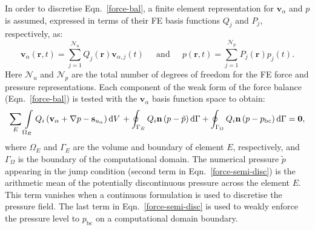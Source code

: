 In order to discretise Eqn.~\ref{force-bal}, a finite element representation for $\mathbf{v}_\alpha$ and $p$ is assumed, expressed in terms of their FE basis functions $Q_{j}$ and $P_{j}$, respectively, as:
\begin{equation}
  \mathbf{v}_\alpha(\bm{r},t) = \sum\limits_{j=1}^{\mathcal{N}_u} Q_{j}(\bm{r})\mathbf{v}_{\alpha,j}(t) \;\;\;\;\text{ and } \;\;\;\; p(\bm{r},t) = \sum\limits_{j=1}^{\mathcal{N}_p} P_{j}(\bm{r})p_{j}(t).
\end{equation} 
Here $\mathcal{N}_{u}$ and $\mathcal{N}_{p}$ are the total number of degrees of freedom for the FE force and pressure representations. Each component of the weak form of the force balance (Eqn.~\ref{force-bal}) is tested with the $\mathbf{v}_\alpha$ basis function space to obtain:
\begin{displaymath}
  \sum\limits_{E} \left. \int\limits_{\Omega_E} { {Q}}_i \left({\mathbf v}_\alpha + \nabla p  -{\mathbf s}_{u_\alpha}\right) \mathrm{d} V \right. + \displaystyle \oint_{\Gamma_{E}} {Q}_i {\mathbf n} \left(p - \tilde{p}\right) \mathrm{d}\Gamma + \oint_{\Gamma_{\Omega}} {Q}_i {\mathbf n} \left(p - p_\text{bc}\right) \mathrm{d}\Gamma = \bm{0},\nonumber \label{force-semi-disc} 
\end{displaymath} 
where $\Omega_E$ and $\Gamma_{E}$ are the volume and boundary of element $E$, respectively, and $\Gamma_{\Omega}$ is the boundary of the computational domain. The numerical pressure $\tilde{p}$ appearing in the jump condition (second term in Eqn.~\ref{force-semi-disc}) is the arithmetic mean of the potentially discontinuous pressure across the element $E$. This term vanishes when a continuous formulation is used to discretise the pressure field. The last term in Eqn.~\ref{force-semi-disc} is used to weakly enforce the pressure level to $p_\text{bc}$ on a computational domain boundary.

